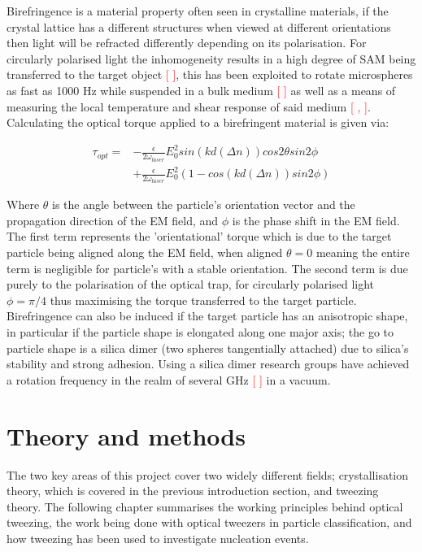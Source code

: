 \documentclass[a4paper,oneside,11pt]{book}
\begin{document}
Birefringence is a material property often seen in crystalline materials, if the crystal lattice has a different structures when viewed at different orientations then light will be refracted differently depending on its polarisation. For circularly polarised light the inhomogeneity results in a high degree of SAM being transferred to the target object \textcolor{red}{[ ]}, this has been exploited to rotate microspheres as fast as 1000 Hz while suspended in a bulk medium \textcolor{red}{[ ]} as well as a means of measuring the local temperature and shear response of said medium \textcolor{red}{[ , ]}. Calculating the optical torque applied to a birefringent material is given via:

\begin{equation}
	\label{eq:opt_torque}
	\begin{aligned}
		\tau_{opt} =& -\frac{\epsilon}{2\omega_{laser}}E_0^2sin(kd(\Delta n))cos2\theta sin2\phi \\ &+  \frac{\epsilon}{2\omega_{laser}}E_0^2 (1-cos(kd(\Delta n))sin2\phi)
	\end{aligned}
\end{equation}

Where $\theta$ is the angle between the particle's orientation vector and the propagation direction of the EM field, and $\phi$ is the phase shift in the EM field.  The first term represents the 'orientational' torque which is due to the target particle being aligned along the EM field, when aligned $\theta=0$ meaning the entire term is negligible for particle's with a stable orientation. The second term is due purely to the polarisation of the optical trap, for circularly polarised light $\phi=\pi/4$ thus maximising the torque transferred to the target particle. Birefringence can also be induced if the target particle has an anisotropic shape, in particular if the particle shape is elongated along one major axis; the go to particle shape is a silica dimer (two spheres tangentially attached) due to silica's stability and strong adhesion. Using a silica dimer research groups have achieved a rotation frequency in the realm of several GHz \textcolor{red}{[ ]} in a vacuum. 


\chapter{Theory and methods}
The two key areas of this project cover two widely different fields; 
crystallisation theory, which is covered in the previous introduction 
section, and tweezing theory. The following chapter summarises the 
working principles behind optical tweezing, the work being done with 
optical tweezers in particle classification, and how tweezing has been 
used to investigate nucleation events. 
\end{document}
